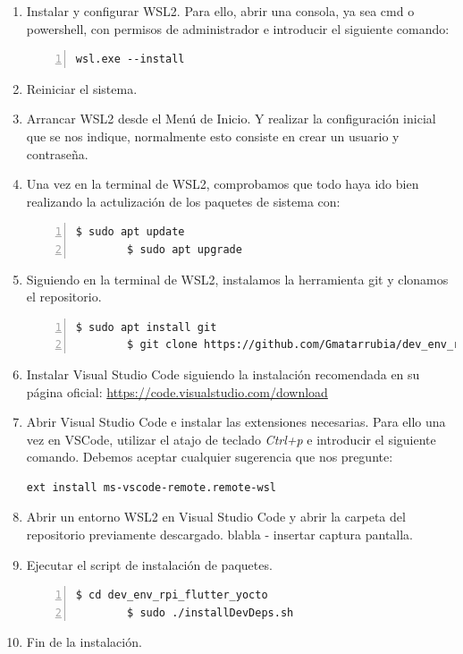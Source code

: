 \begin{enumerate}
    \item Instalar y configurar \gls{WSL2}. Para ello, abrir una consola, ya sea cmd
    o powershell, con permisos de administrador e introducir el siguiente comando:
    \begin{lstlisting}[style=cmd, numbers=left]
        wsl.exe --install
    \end{lstlisting}

    \item Reiniciar el sistema.

    \item Arrancar \gls{WSL2} desde el Menú de Inicio. Y realizar la configuración
    inicial que se nos indique, normalmente esto consiste en crear un usuario y
    contraseña.

    \item Una vez en la terminal de \gls{WSL2}, comprobamos que todo haya ido bien realizando
    la actulización de los paquetes de sistema con:
    \begin{lstlisting}[style=consola, numbers=left]
        $ sudo apt update
        $ sudo apt upgrade
    \end{lstlisting}

    \item Siguiendo en la terminal de \gls{WSL2}, instalamos la herramienta git y clonamos
    el repositorio.
    \begin{lstlisting}[style=consola, numbers=left]
        $ sudo apt install git
        $ git clone https://github.com/Gmatarrubia/dev_env_rpi_flutter_yocto.git
    \end{lstlisting}

    \item Instalar Visual Studio Code siguiendo la instalación recomendada en su página
    oficial: \href{https://code.visualstudio.com/download}{https://code.visualstudio.com/download}

    \item Abrir Visual Studio Code e instalar las extensiones necesarias. Para ello
    una vez en VSCode, utilizar el atajo de teclado \emph{Ctrl+p} e introducir el siguiente
    comando. Debemos aceptar cualquier sugerencia que nos pregunte:
    \begin{lstlisting}[style=cmd]
        ext install ms-vscode-remote.remote-wsl
    \end{lstlisting}

    \item Abrir un entorno \gls{WSL2} en Visual Studio Code y abrir la carpeta del repositorio
    previamente descargado.
    blabla - insertar captura pantalla.

    \item Ejecutar el script de instalación de paquetes.
    \begin{lstlisting}[style=consola, numbers=left]
        $ cd dev_env_rpi_flutter_yocto
        $ sudo ./installDevDeps.sh
    \end{lstlisting}

    \item Fin de la instalación.
\end{enumerate}

